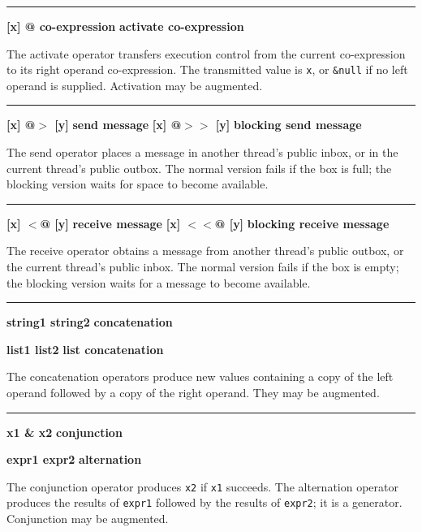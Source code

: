 \bigskip\hrule\vspace{0.1cm}
\noindent
{\bf [x] @ co-expression } \hfill {\bf activate co-expression}

\noindent
The activate operator transfers execution
control from the current co-expression to its right operand
co-expression. The transmitted value is \texttt{x}, or \texttt{\&null}
if no left operand is supplied. Activation may be augmented.

\bigskip\hrule\vspace{0.1cm}
\noindent
{\bf [x] @$>$ [y] } \hfill {\bf send message}
 \linebreak
\noindent
{\bf [x] @$>>$ [y] } \hfill {\bf blocking send message}

\noindent
The send operator places a message in another thread's public
inbox, or in the current thread's public outbox. The normal version fails
if the box is full; the blocking version waits for space to become
available.

\bigskip\hrule\vspace{0.1cm}
\noindent
{\bf [x] $<$@ [y] } \hfill {\bf receive message}
 \linebreak
\noindent
{\bf [x] $<<$@ [y] } \hfill {\bf blocking receive message}

\noindent
The receive operator obtains a message from another thread's public
outbox, or the current thread's public inbox. The normal version fails
if the box is empty; the blocking version waits for a message to become
available.

\bigskip\hrule\vspace{0.1cm}
\noindent
{\bf string1 {\textbar}{\textbar} string2 } \hfill {\bf concatenation}

\noindent
{\bf list1 {\textbar}{\textbar}{\textbar} list2 } \hfill {\bf list concatenation}

\noindent
The concatenation operators produce new values
containing a copy of the left operand followed by a copy of the right
operand. They may be augmented.

\bigskip\hrule\vspace{0.1cm}
\noindent
{\bf x1 \& x2 } \hfill {\bf conjunction}

\noindent
{\bf expr1 {\textbar} expr2 } \hfill {\bf alternation}

\noindent
The conjunction operator produces \texttt{x2} if
\texttt{x1} succeeds. The 
alternation operator produces the results of \texttt{expr1} followed
by the results of \texttt{expr2}; it is a generator.
Conjunction may be augmented.

